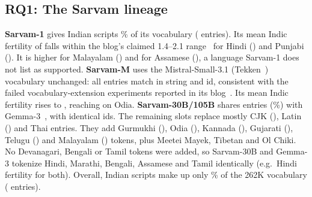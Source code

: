 \documentclass[conference]{IEEEtran}
\begin{document}
\begin{table}[t]
\centering\footnotesize
\caption{Mean fertility, parity and ASR over Indo-Aryan (IA) and Dravidian (Dr) languages; En = English fertility.}
\label{tab:main}
\setlength{\tabcolsep}{2.5pt}
\resizebox{\columnwidth}{!}{}
\end{table}

\subsection{RQ1: The Sarvam lineage}
\textbf{Sarvam-1} gives Indian scripts \% of its vocabulary ( entries). Its mean Indic fertility of  falls within the blog's claimed 1.4--2.1 range~\cite{sarvam2024sarvam1} for Hindi () and Punjabi (). It is higher for Malayalam () and for Assamese (), a language Sarvam-1 does not list as supported.
\textbf{Sarvam-M} uses the Mistral-Small-3.1 (Tekken~\cite{mistral2024nemo}) vocabulary unchanged: all  entries match in string and id, consistent with the failed vocabulary-extension experiments reported in its blog~\cite{sarvam2025sarvamm}. Its mean Indic fertility rises to , reaching  on Odia.
\textbf{Sarvam-30B/105B} shares  entries (\%) with Gemma-3~\cite{gemma2025gemma3}, with identical ids. The remaining  slots replace mostly CJK (), Latin () and Thai entries. They add Gurmukhi (), Odia (), Kannada (), Gujarati (), Telugu () and Malayalam () tokens, plus Meetei Mayek, Tibetan and Ol Chiki. No Devanagari, Bengali or Tamil tokens were added, so Sarvam-30B and Gemma-3 tokenize Hindi, Marathi, Bengali, Assamese and Tamil identically (e.g.\ Hindi fertility  for both). Overall, Indian scripts make up only \% of the 262K vocabulary ( entries).
\end{document}
